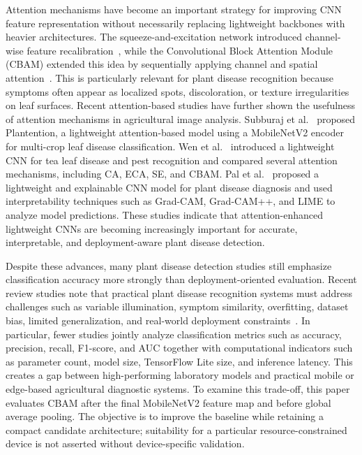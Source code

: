 Attention mechanisms have become an important strategy for improving CNN feature representation without necessarily replacing lightweight backbones with heavier architectures. The squeeze-and-excitation network introduced channel-wise feature recalibration~\cite{hu2018senet}, while the Convolutional Block Attention Module (CBAM) extended this idea by sequentially applying channel and spatial attention~\cite{woo2018cbam}. This is particularly relevant for plant disease recognition because symptoms often appear as localized spots, discoloration, or texture irregularities on leaf surfaces. Recent attention-based studies have further shown the usefulness of attention mechanisms in agricultural image analysis. Subburaj et al.~\cite{subburaj2025plantention} proposed Plantention, a lightweight attention-based model using a MobileNetV2 encoder for multi-crop leaf disease classification. Wen et al.~\cite{wen2025mnasnet} introduced a lightweight CNN for tea leaf disease and pest recognition and compared several attention mechanisms, including CA, ECA, SE, and CBAM. Pal et al.~\cite{pal2025mobres} proposed a lightweight and explainable CNN model for plant disease diagnosis and used interpretability techniques such as Grad-CAM, Grad-CAM++, and LIME to analyze model predictions. These studies indicate that attention-enhanced lightweight CNNs are becoming increasingly important for accurate, interpretable, and deployment-aware plant disease detection.

Despite these advances, many plant disease detection studies still emphasize classification accuracy more strongly than deployment-oriented evaluation. Recent review studies note that practical plant disease recognition systems must address challenges such as variable illumination, symptom similarity, overfitting, dataset bias, limited generalization, and real-world deployment constraints~\cite{zhao2025review,nyawose2025review,sajitha2024review}. In particular, fewer studies jointly analyze classification metrics such as accuracy, precision, recall, F1-score, and AUC together with computational indicators such as parameter count, model size, TensorFlow Lite size, and inference latency. This creates a gap between high-performing laboratory models and practical mobile or edge-based agricultural diagnostic systems. To examine this trade-off, this paper evaluates CBAM after the final MobileNetV2 feature map and before global average pooling. The objective is to improve the baseline while retaining a compact candidate architecture; suitability for a particular resource-constrained device is not asserted without device-specific validation.

